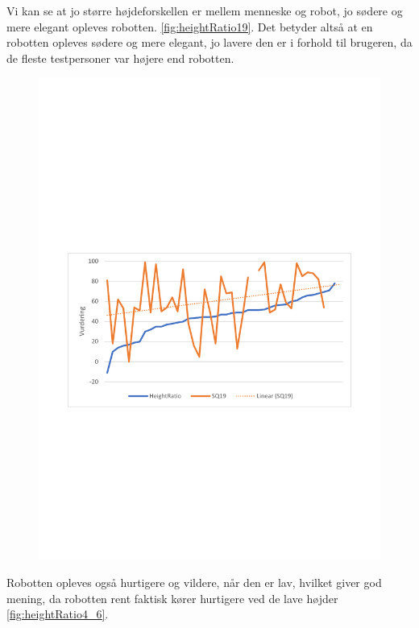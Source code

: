  Vi kan se at jo større højdeforskellen er mellem menneske og robot, jo sødere og mere elegant opleves robotten. \autoref{fig:heightRatio19}. Det betyder altså at en robotten opleves sødere og mere elegant, jo lavere den er i forhold til brugeren, da de fleste testpersoner var højere end robotten.

\begin{figure}[H]
\centering
\includegraphics[width=\textwidth]{Figure/DatabehandlingSkalaer/Demografi/HeightRatio.pdf}
\caption{}
\label{fig:heightRatio19}
\end{figure}
\noindent

Robotten opleves også hurtigere og vildere, når den er lav, hvilket giver god mening, da robotten rent faktisk kører hurtigere ved de lave højder \autoref{fig:heightRatio4_6}.


